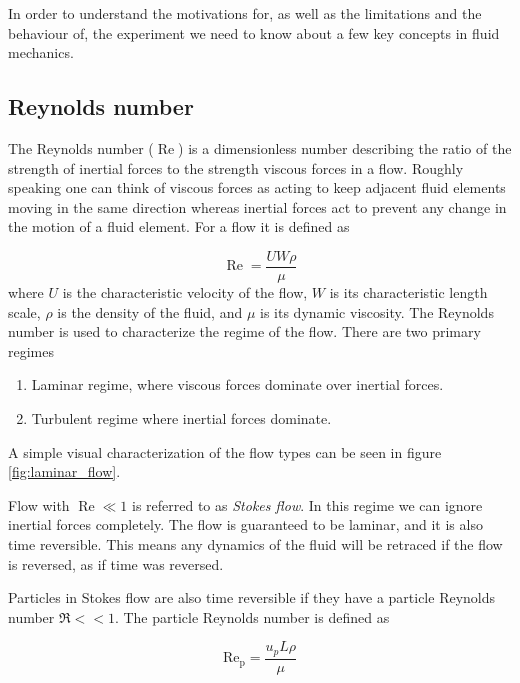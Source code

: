 \label{sec:fluid}
In order to understand the motivations for, as well as the limitations and the behaviour of, the experiment we need to know about a few key concepts in fluid mechanics.

\subsection{Reynolds number}
The Reynolds number ($\operatorname{Re}$) is a dimensionless number describing the ratio of the strength of inertial forces to the strength viscous forces in a flow. Roughly speaking one can think of viscous forces as acting to keep adjacent fluid elements moving in the same direction whereas inertial forces act to prevent any change in the motion of a fluid element. For a flow it is defined as \cite{introfluid}

\begin{equation}\label{eq:reynolds}
\operatorname{Re} = \frac{U W \rho}{\mu}
\end{equation}
where $U$ is the characteristic velocity of the flow, $W$ is its characteristic length scale, $\rho$ is the density of the fluid, and $\mu$ is its dynamic viscosity. The Reynolds number is used to characterize the regime of the flow. There are two primary regimes
\begin{enumerate}
\item Laminar regime, where viscous forces dominate over inertial forces.
\item Turbulent regime where inertial forces dominate.
\end{enumerate}

\noindent A simple visual characterization of the flow types can be seen in figure \ref{fig:laminar_flow}. 

Flow with $\operatorname{Re}\ll 1$ is referred to as \emph{Stokes flow}. In this regime we can ignore inertial forces completely. The flow is guaranteed to be laminar, and it is also time reversible. This means any dynamics of the fluid will be retraced if the flow is reversed, as if time was reversed. ~\cite{introfluid3}
 
Particles in Stokes flow are also time reversible if they have a particle Reynolds number $\Re << 1$. The particle Reynolds number is defined as \cite{JonasLic}

\begin{equation}\label{eq:reynoldsparticle}
\operatorname{Re_p} = \frac{u_p L \rho}{\mu}
\end{equation}

